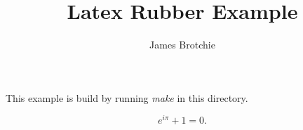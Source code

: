 \documentclass{article}
\title{Latex Rubber Example}
\author{James Brotchie}
\begin{document}
\maketitle

This example is build by running \emph{make} in this directory.

\begin{equation}
e^{i\pi} + 1 = 0.
\end{equation}
\end{document}
